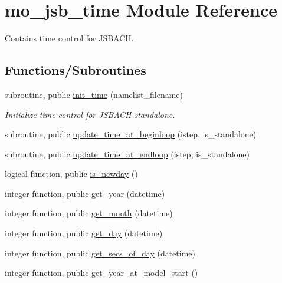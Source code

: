 \hypertarget{namespacemo__jsb__time}{}\section{mo\+\_\+jsb\+\_\+time Module Reference}
\label{namespacemo__jsb__time}


Contains time control for J\+S\+B\+A\+C\+H.  


\subsection*{Functions/\+Subroutines}
\begin{DoxyCompactItemize}
\item 
subroutine, public \hyperlink{namespacemo__jsb__time_af406b57a3b7ee99184a5ca90996d63de}{init\+\_\+time} (namelist\+\_\+filename)
\begin{DoxyCompactList}\small\item\em Initialize time control for J\+S\+B\+A\+C\+H standalone. \end{DoxyCompactList}\item 
subroutine, public \hyperlink{namespacemo__jsb__time_a730df761753fbbdb7d42e0a8df801907}{update\+\_\+time\+\_\+at\+\_\+beginloop} (istep, is\+\_\+standalone)
\item 
subroutine, public \hyperlink{namespacemo__jsb__time_ac894ecb723bd71f8506bff6f279e323e}{update\+\_\+time\+\_\+at\+\_\+endloop} (istep, is\+\_\+standalone)
\item 
logical function, public \hyperlink{namespacemo__jsb__time_aaf4eeda4cb187ded221b00e4fd1c3448}{is\+\_\+newday} ()
\item 
integer function, public \hyperlink{namespacemo__jsb__time_adf7b7e4156df6e151e9274d0d94dc601}{get\+\_\+year} (datetime)
\item 
integer function, public \hyperlink{namespacemo__jsb__time_a58e1d9b59545569a0eced95aca165c58}{get\+\_\+month} (datetime)
\item 
integer function, public \hyperlink{namespacemo__jsb__time_a6b454a27050a101777b380f81321b779}{get\+\_\+day} (datetime)
\item 
integer function, public \hyperlink{namespacemo__jsb__time_aa3a34d4460604cad784963d39ca47fbe}{get\+\_\+secs\+\_\+of\+\_\+day} (datetime)
\item 
integer function, public \hyperlink{namespacemo__jsb__time_a9dd8cce6102dffffa97513d7b4d2e45b}{get\+\_\+year\+\_\+at\+\_\+model\+\_\+start} ()
\end{DoxyCompactItemize}
